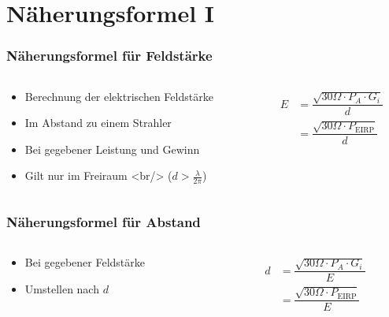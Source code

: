 
\section{Näherungsformel I}
\label{section:naeherungsformel_1}
\begin{frame}%

\frametitle{Näherungsformel für Feldstärke}
\begin{columns}
    \begin{column}{0.48\textwidth}
    \begin{itemize}
  \item Berechnung der elektrischen Feldstärke
  \item Im Abstand zu einem Strahler
  \item Bei gegebener Leistung und Gewinn
  \item Gilt nur im Freiraum <br/> ($d > \frac{\lambda}{2\pi}$)
  \end{itemize}

    \end{column}
   \begin{column}{0.48\textwidth}
       \begin{equation}\begin{split} E &= \dfrac{\sqrt{30\Omega \cdot P_A \cdot G_i}}{d}\\ &= \dfrac{\sqrt{30\Omega \cdot P_{\textrm{EIRP}}}}{d} \end{split}\end{equation}


   \end{column}
\end{columns}

\end{frame}

\begin{frame}
\frametitle{Näherungsformel für Abstand}
\begin{columns}
    \begin{column}{0.48\textwidth}
    \begin{itemize}
  \item Bei gegebener Feldstärke
  \item Umstellen nach $d$
  \end{itemize}

    \end{column}
   \begin{column}{0.48\textwidth}
       \begin{equation}\begin{split} d &= \dfrac{\sqrt{30\Omega \cdot P_A \cdot G_i}}{E}\\ &= \dfrac{\sqrt{30\Omega \cdot P_{\textrm{EIRP}}}}{E} \end{split}\end{equation}


   \end{column}
\end{columns}

\end{frame}


